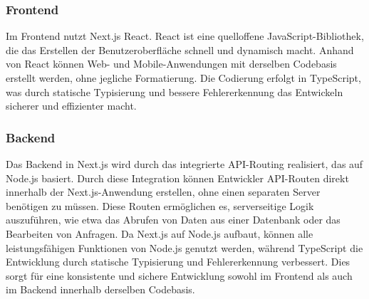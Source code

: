 \documentclass[a4paper,12pt]{article}
\begin{document}

\subsubsection{Frontend}
Im Frontend nutzt Next.js React. React ist eine quelloffene JavaScript-Bibliothek, die das Erstellen der Benutzeroberfläche schnell und dynamisch macht. Anhand von React können Web- und Mobile-Anwendungen mit derselben Codebasis erstellt werden, ohne jegliche Formatierung. Die Codierung erfolgt in TypeScript, was durch statische Typisierung und bessere Fehlererkennung das Entwickeln sicherer und effizienter macht.


\subsubsection{Backend}
Das \gls{Backend} in Next.js wird durch das integrierte API-Routing realisiert, das auf Node.js basiert. Durch diese Integration können Entwickler API-Routen direkt innerhalb der Next.js-Anwendung erstellen, ohne einen separaten Server benötigen zu müssen. Diese Routen ermöglichen es, serverseitige Logik auszuführen, wie etwa das Abrufen von Daten aus einer Datenbank oder das Bearbeiten von Anfragen. Da Next.js auf Node.js aufbaut, können alle leistungsfähigen Funktionen von Node.js genutzt werden, während TypeScript die Entwicklung durch statische Typisierung und Fehlererkennung verbessert. Dies sorgt für eine konsistente und sichere Entwicklung sowohl im Frontend als auch im Backend innerhalb derselben Codebasis.

\newpage

\end{document}
